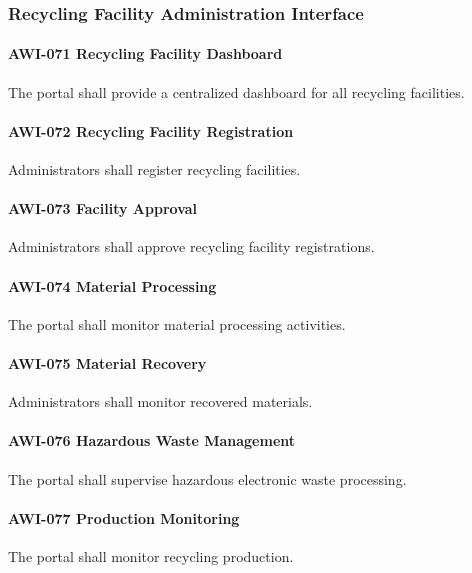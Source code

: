 \subsubsection*{Recycling Facility Administration Interface}

\paragraph{AWI-071 Recycling Facility Dashboard}

The portal shall provide a centralized dashboard for all recycling
facilities.

\paragraph{AWI-072 Recycling Facility Registration}

Administrators shall register recycling facilities.

\paragraph{AWI-073 Facility Approval}

Administrators shall approve recycling facility registrations.

\paragraph{AWI-074 Material Processing}

The portal shall monitor material processing activities.

\paragraph{AWI-075 Material Recovery}

Administrators shall monitor recovered materials.

\paragraph{AWI-076 Hazardous Waste Management}

The portal shall supervise hazardous electronic waste processing.

\paragraph{AWI-077 Production Monitoring}

The portal shall monitor recycling production.

